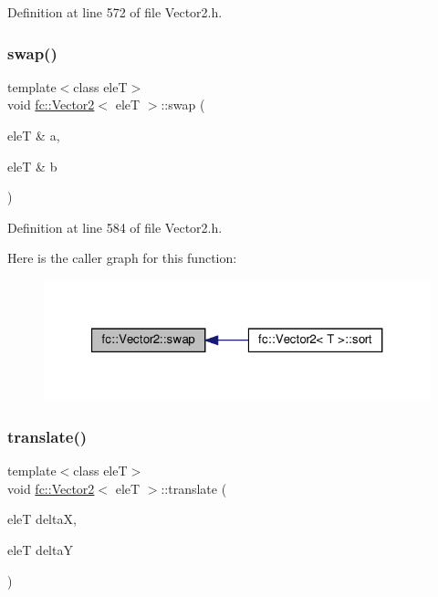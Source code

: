Definition at line 572 of file Vector2.\+h.

\mbox{\label{classfc_1_1Vector2_a26132f5546aacaf025d2b26c00617c67}} 
\subsubsection{\texorpdfstring{swap()}{swap()}}
{\footnotesize\ttfamily template$<$class eleT$>$ \\
void \hyperlink{classfc_1_1Vector2}{fc\+::\+Vector2}$<$ eleT $>$\+::swap (\begin{DoxyParamCaption}\item[{eleT \&}]{a,  }\item[{eleT \&}]{b }\end{DoxyParamCaption})\hspace{0.3cm}{\ttfamily [private]}}



Definition at line 584 of file Vector2.\+h.

Here is the caller graph for this function\+:
\nopagebreak
\begin{figure}[H]
\begin{center}
\leavevmode
\includegraphics[width=321pt]{d9/d08/classfc_1_1Vector2_a26132f5546aacaf025d2b26c00617c67_icgraph}
\end{center}
\end{figure}
\mbox{\label{classfc_1_1Vector2_aceb03f4c1b057710fbb95d0b29c11e1b}} 
\subsubsection{\texorpdfstring{translate()}{translate()}}
{\footnotesize\ttfamily template$<$class eleT$>$ \\
void \hyperlink{classfc_1_1Vector2}{fc\+::\+Vector2}$<$ eleT $>$\+::translate (\begin{DoxyParamCaption}\item[{eleT}]{deltaX,  }\item[{eleT}]{deltaY }\end{DoxyParamCaption})}



